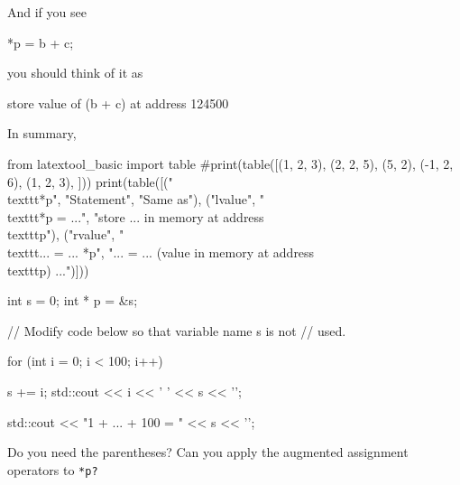 And if you see

\begin{consolethree}[escapeinside=||]
*p = b + c;
\end{consolethree}

you should think of it as

\begin{consolethree}[escapeinside=||]
store value of (b + c) at address 124500
\end{consolethree}

In summary,
\begin{python}
from latextool_basic import table
#print(table([(1, 2, 3), (2, 2, 5), (5, 2), (-1, 2, 6), (1, 2, 3), ]))
print(table([("\\texttt{*p}", "Statement", "Same as"), ("lvalue", "\\texttt{*p = ...}", "store ... in memory at address \\texttt{p}"), ("rvalue", "\\texttt{... = ... *p}", "... = ... (value in memory at address \\texttt{p}) ...")]))
\end{python}












\begin{consolethree}[escapeinside=||]
int s = 0;
int * p = &s;

// Modify code below so that variable name s is not
// used.

for (int i = 0; i < 100; i++)

{   
    s += i;
    std::cout << i << ' ' << s << '\n';
}

std::cout << "1 + ... + 100 = " << s << '\n';
\end{consolethree}




Do you need the parentheses? Can you apply the augmented assignment operators to \texttt{*p?}


